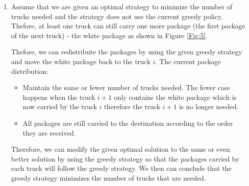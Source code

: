 \documentclass[11pts]{report}
\begin{document}
\begin{enumerate}
\item Assume that we are given an optimal strategy to minimize the number of trucks needed and the strategy does not use the current greedy policy. Thefore, at least one truck can still carry one more package (the first package of the next truck) - the white package as shown in Figure \ref{Fig:5}.




Thefore, we can redistribute the packages by using the given greedy strategy and move the white package back to the truck $i$. The current package distribution:

\begin{itemize}
\item Maintain the same or fewer number of trucks needed. The fewer case happens when the truck $i+1$ only contains the white package which is now carried by the truck $i$ therefore the truck $i+1$ is no longer needed.
\item All packages are still carried to the destination according to the order they are received.
\end{itemize}

Therefore, we can modify the given optimal solution to the same or even better solution by using the greedy strategy so that the packages carried by each truck will follow the greedy strategy. We then can conclude that the greedy strategy minimizes the number of trucks that are needed.

\end{enumerate}
\end{document}
